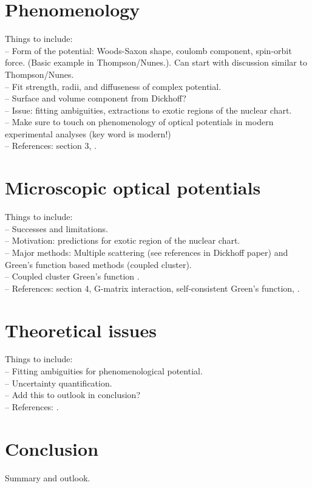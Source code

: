 \documentclass[preprintnumbers,floatfix,aps,prc,preprint,nofootinbib]{revtex4-1}
\begin{document}
\section{Phenomenology}
\label{sec:phenomenology}


Things to include:
\\
-- Form of the potential: Woods-Saxon shape, coulomb component, spin-orbit force. (Basic example in Thompson/Nunes.). Can start with discussion similar to Thompson/Nunes.
\\
-- Fit strength, radii, and diffuseness of complex potential.
\\
-- Surface and volume component from Dickhoff?
\\
-- Issue: fitting ambiguities, extractions to exotic regions of the nuclear chart.
\\
-- Make sure to touch on phenomenology of optical potentials in modern experimental analyses (key word is modern!)
\\
-- References: \cite{Dickhoff:2018wdd} section 3, \cite{Koning:2003zz}.



\section{Microscopic optical potentials}
\label{sec:microscopic}


Things to include:
\\
-- Successes and limitations.
\\
-- Motivation: predictions for exotic region of the nuclear chart.
\\
-- Major methods: Multiple scattering (see references in Dickhoff paper) and Green's function based methods (coupled cluster).
\\
-- Coupled cluster Green's function \cite{Rotureau:2016jpf}.
\\
-- References: \cite{Dickhoff:2018wdd} section 4, \cite{Furumoto:2019anr} G-matrix interaction, \cite{Idini:2019hkq} self-consistent Green's function, \cite{Rotureau:2016jpf}.


\section{Theoretical issues}
\label{sec:section_4}


Things to include:
\\
-- Fitting ambiguities for phenomenological potential.
\\
-- Uncertainty quantification.
\\
-- Add this to outlook in conclusion?
\\
-- References: \cite{King:2018vzw}.


\section{Conclusion}
\label{sec:conclusion}


Summary and outlook.





\end{document}
